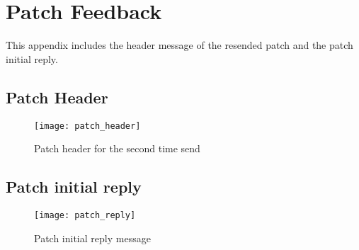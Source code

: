 \chapter{Patch Feedback}

\label{app:feedback}

This appendix includes the header message of the resended patch and the 
patch initial reply.

\section{Patch Header} 

\begin{figure}
\texttt{[image: patch\_header]}
\caption{Patch header for the second time send}
\label{fig:transform}
\end{figure}

\section{Patch initial reply}

\begin{figure}
\texttt{[image: patch\_reply]}
\caption{Patch initial reply message}
\label{fig:transform}
\end{figure}
